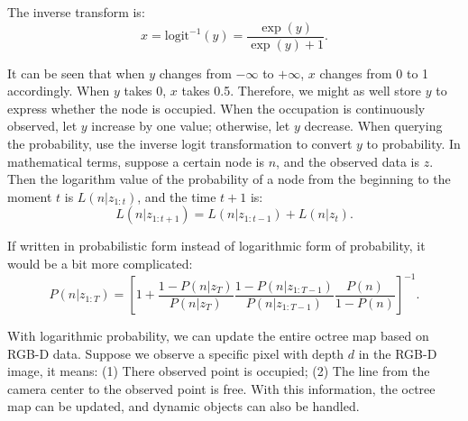 The inverse transform is:
\begin{equation}
x = \mathrm{logit}^{-1}(y) = \frac{\exp(y)}{\exp(y)+1}.
\end{equation}

It can be seen that when $y$ changes from $-\infty$ to $+\infty$, $x$ changes from 0 to 1 accordingly. When $y$ takes 0, $x$ takes 0.5. Therefore, we might as well store $y$ to express whether the node is occupied. When the occupation is continuously observed, let $y$ increase by one value; otherwise, let $y$ decrease. When querying the probability, use the inverse logit transformation to convert $y$ to probability. In mathematical terms, suppose a certain node is $n$, and the observed data is $z$. Then the logarithm value of the probability of a node from the beginning to the moment $t$ is $L(n|z_{1:t})$, and the time $t+1$ is:
\begin{equation}
	L(n|z_{1:t+1}) = L(n|z_{1:t-1}) + L(n|z_{t}).
\end{equation}

If written in probabilistic form instead of logarithmic form of probability, it would be a bit more complicated:
\begin{equation}
	P(n|z_{1:T}) =  \left[ 1+ \frac{1-P(n|z_T)}{P(n|z_T)} \frac{1-P(n|z_{1:T-1})}{P(n|z_{1:T-1})} \frac{P(n)}{1-P(n)} \right]^{-1}.
\end{equation}

With logarithmic probability, we can update the entire octree map based on RGB-D data. Suppose we observe a specific pixel with depth $d$ in the RGB-D image, it means: (1) There observed point is occupied; (2) The line from the camera center to the observed point is free. With this information, the octree map can be updated, and dynamic objects can also be handled. 

